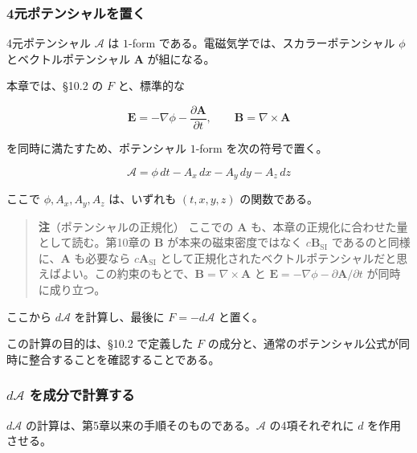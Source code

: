 \documentclass[a4paper,12pt,openany]{book}
\begin{document}
\hypertarget{ux5143ux30ddux30c6ux30f3ux30b7ux30e3ux30ebux3092ux7f6eux304f}{%
\subsubsection{4元ポテンシャルを置く}\label{ux5143ux30ddux30c6ux30f3ux30b7ux30e3ux30ebux3092ux7f6eux304f}}

4元ポテンシャル \(\mathcal{A}\) は \(1\)-form
である。電磁気学では、スカラーポテンシャル \(\phi\)
とベクトルポテンシャル \(\mathbf{A}\) が組になる。

本章では、§10.2 の \(F\) と、標準的な

\[
\mathbf{E}
=
-\nabla\phi
-
\frac{\partial\mathbf{A}}{\partial t},
\qquad
\mathbf{B}
=
\nabla\times\mathbf{A}
\]

を同時に満たすため、ポテンシャル \(1\)-form を次の符号で置く。

\[
\mathcal{A}
=
\phi\,dt
-
A_x\,dx
-
A_y\,dy
-
A_z\,dz
\]

ここで \(\phi,A_x,A_y,A_z\) は、いずれも \((t,x,y,z)\) の関数である。

\begin{quote}
\textbf{注}（ポテンシャルの正規化） ここでの \(\mathbf{A}\)
も、本章の正規化に合わせた量として読む。第10章の \(\mathbf{B}\)
が本来の磁束密度ではなく \(c\mathbf{B}_{\mathrm{SI}}\)
であるのと同様に、\(\mathbf{A}\) も必要なら
\(c\mathbf{A}_{\mathrm{SI}}\)
として正規化されたベクトルポテンシャルだと思えばよい。この約束のもとで、\(\mathbf{B}=\nabla\times\mathbf{A}\)
と \(\mathbf{E}=-\nabla\phi-\partial\mathbf{A}/\partial t\)
が同時に成り立つ。
\end{quote}

ここから \(d\mathcal{A}\) を計算し、最後に \(F=-d\mathcal{A}\) と置く。

この計算の目的は、§10.2 で定義した \(F\)
の成分と、通常のポテンシャル公式が同時に整合することを確認することである。

\hypertarget{dmathcala-ux3092ux6210ux5206ux3067ux8a08ux7b97ux3059ux308b}{%
\subsubsection{\texorpdfstring{\(d\mathcal{A}\)
を成分で計算する}{d\textbackslash mathcal\{A\} を成分で計算する}}\label{dmathcala-ux3092ux6210ux5206ux3067ux8a08ux7b97ux3059ux308b}}

\(d\mathcal{A}\)
の計算は、第5章以来の手順そのものである。\(\mathcal{A}\) の4項それぞれに
\(d\) を作用させる。
\end{document}

